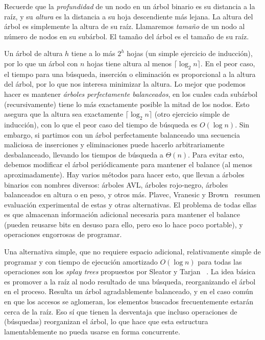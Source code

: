   Recuerde que la \emph{profundidad} de un nodo en un árbol binario
  es su distancia a la raíz,
  y su \emph{altura} es la distancia a su hoja descendiente más lejana.
  La altura del árbol es simplemente la altura de su raíz.
  Llamaremos \emph{tamaño} de un nodo al número de nodos en su subárbol.
  El tamaño del árbol es el tamaño de su raíz.

  Un árbol de altura \(h\) tiene a lo más \(2^h\) hojas
  (un simple ejercicio de inducción),
  por lo que un árbol con \(n\) hojas
  tiene altura al menos \(\lceil \log_2 n \rceil\).
  En el peor caso,
  el tiempo para una búsqueda, inserción o eliminación
  es proporcional a la altura del árbol,
  por lo que nos interesa minimizar la altura.
  Lo mejor que podemos hacer
  es mantener \emph{árboles perfectamente balanceados},
  en los cuales cada subárbol
  (recursivamente)
  tiene lo más exactamente posible la mitad de los nodos.
  Esto asegura que la altura sea exactamente \(\lceil \log_2 n \rceil\)
  (otro ejercicio simple de inducción),
  con lo que el peor caso del tiempo de búsqueda es \(O(\log n)\).
  Sin embargo,
  si partimos con un árbol perfectamente balanceado
  una secuencia maliciosa de inserciones y eliminaciones
  puede hacerlo arbitrariamente desbalanceado,
  llevando los tiempos de búsqueda a \(\Theta(n)\).
  Para evitar esto,
  debemos modificar el árbol periódicamente para mantener el balance
  (al menos aproximadamente).
  Hay varios métodos para hacer esto,
  que llevan a árboles binarios con nombres diversos:
  árboles AVL,
  árboles rojo-negro,
  árboles balanceados en altura
  o en peso,
  y otros más.
  Plavec, Vranesic y Brown~%
    \cite{plavec07:_digital_search_trees}
  resumen evaluación experimental de estas
  y otras alternativas.
  El problema de todas ellas es que almacenan información adicional
  necesaria para mantener el balance
  (pueden reusarse bits en desuso para ello,
   pero eso lo hace poco portable),
  y operaciones engorrosas de programar.

  Una alternativa simple,
  que no requiere espacio adicional,
  relativamente simple de programar
  y con tiempo de ejecución amortizado \(O(\log n)\) para todas las operaciones
  son los \emph{\foreignlanguage{english}{splay trees}}
  propuestos por Sleator y Tarjan~%
    \cite{sleator85:_splay_trees}.
  La idea básica es promover a la raíz al nodo resultado de una búsqueda,
  reorganizando el árbol en el proceso.
  Resulta un árbol agradablemente balanceado,
  y en el caso común en que los accesos se aglomeran,
  los elementos buscados frecuentemente estarán cerca de la raíz.
  Eso sí que tienen la desventaja que incluso operaciones de 
  (búsquedas)
  reorganizan el árbol,
  lo que hace que esta estructura
  lamentablemente no pueda usarse en forma concurrente.

